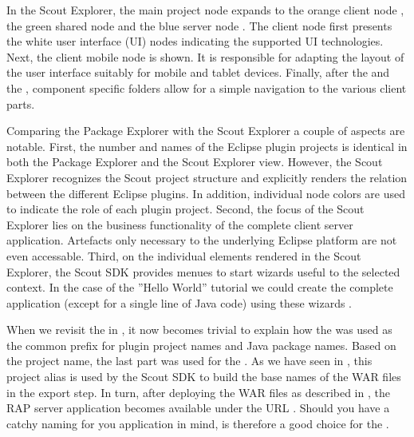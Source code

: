 \documentclass[a4paper,10pt,twoside]{book}
\begin{document}
In the Scout Explorer, the main project node expands to the orange client node , the green shared node  and the blue server node .
The client node first presents the white user interface (UI) nodes  indicating the supported UI technologies.
Next, the client mobile node  is shown.
It is responsible for adapting the layout of the user interface suitably for mobile and tablet devices.
Finally, after the  and the , component specific folders allow for a simple navigation to the various client parts.

Comparing the Package Explorer with the Scout Explorer a couple of aspects are notable.
First, the number and names of the Eclipse plugin projects is identical in both the Package Explorer and the Scout Explorer view.
However, the Scout Explorer recognizes the Scout project structure and explicitly renders the relation between the different Eclipse plugins.
In addition, individual node colors are used to indicate the role of each plugin project.
Second, the focus of the Scout Explorer lies on the business functionality of the complete client server application.
Artefacts only necessary to the underlying Eclipse platform are not even accessable.
Third, on the individual elements rendered in the Scout Explorer, the Scout SDK provides menues to start wizards useful to the selected context.
In the case of the ''Hello World'' tutorial we could create the complete application (except for a single line of Java code) using these wizards .

When we revisit the  in , it now becomes trivial to explain how the   was used as the common prefix for plugin project names and Java package names.
Based on the project name, the last part  was used for the .
As we have seen in , this project alias is used by the Scout SDK to build the base names of the WAR files in the export step.
In turn, after deploying the WAR files as described in , the RAP server application becomes available under the URL .
Should you have a catchy naming for you application in mind,  is therefore a good choice for the .
\end{document}
